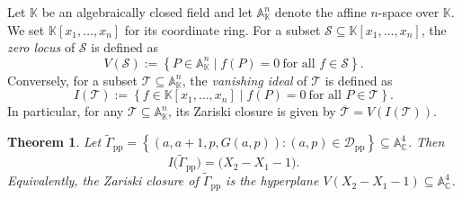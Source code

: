 \documentclass[reqno, 12pt]{article}
\numberwithin{equation}{section}
\newtheorem{theorem}{Theorem}[section]
\theoremstyle{definition}
\newcommand{\Aff}{\mathbb A}
\newcommand{\CC}{\mathbb{C}}
\newcommand{\cD}{\mathcal D}
\begin{document}
Let $\mathbb{K}$ be an algebraically closed field and let $\mathbb{A}^n_\mathbb{K}$ denote the affine $n$-space over $\mathbb{K}$. We set $\mathbb{K}[x_1, \dots, x_n]$ for its coordinate ring.
For a subset $\mathcal{S} \subseteq \mathbb{K}[x_1, \dots, x_n]$, the \emph{zero locus} of $\mathcal{S}$ is defined as
\[V(\mathcal{S}) := \left\{ P \in \mathbb{A}^n_\mathbb{K} \mid f(P) = 0 \ \text{for all } f \in \mathcal{S} \right\}.
\]
Conversely, for a subset $\mathcal{T} \subseteq \mathbb{A}^n_\mathbb{K}$, the \emph{vanishing ideal} of $\mathcal{T}$ is defined as
\[I(\mathcal{T}) := \left\{ f \in \mathbb{K}[x_1, \dots, x_n] \mid f(P) = 0 \ \text{for all } P \in \mathcal{T} \right\}.
\]
In particular, for any $\mathcal{T} \subseteq \mathbb{A}^n_\mathbb{K}$, its Zariski closure is given by $\overline{\mathcal{T}} = V(I(\mathcal{T}))$.


\begin{theorem}\label{thm:four-variable-ideal}
Let $\widetilde\Gamma_{\mathrm{pp}}=\left\{\left(a,a+1,p,G(a,p)\right):(a,p)\in\cD_{\mathrm{pp}}\right\}\subseteq\Aff^4_{\CC}$.
Then
\begin{equation}\label{eq:four-variable-ideal}
 I\bigl(\widetilde\Gamma_{\mathrm{pp}}\bigr)=\bigl(X_2-X_1-1\bigr).
\end{equation}
Equivalently, the Zariski closure of $\widetilde\Gamma_{\mathrm{pp}}$ is the hyperplane $V(X_2-X_1-1)\subseteq\Aff^4_{\CC}$.
\end{theorem}
\end{document}
